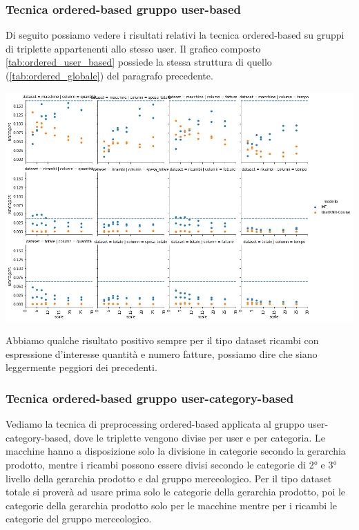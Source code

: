 \subsubsection{Tecnica ordered-based gruppo user-based}
Di seguito possiamo vedere i risultati relativi la tecnica ordered-based su gruppi di triplette appartenenti allo stesso user.
Il grafico composto \ref{tab:ordered_user_based} possiede la stessa struttura di quello (\ref{tab:ordered_globale}) del paragrafo precedente.
\begin{center}
    \includegraphics[width=16cm]{figures/risultati_ordered_singolo.png}
    \label{tab:ordered_user_based}
\end{center}
Abbiamo qualche risultato positivo sempre per il tipo dataset ricambi con espressione d'interesse quantità e numero fatture, possiamo dire che siano leggermente peggiori dei precedenti.

\subsubsection{Tecnica ordered-based gruppo user-category-based}
Vediamo la tecnica di preprocessing ordered-based applicata al gruppo user-category-based, dove le triplette vengono divise per user e per categoria.
Le macchine hanno a disposizione solo la divisione in categorie secondo la gerarchia prodotto, mentre i ricambi possono essere divisi secondo le categorie di 2° e 3° livello della gerarchia prodotto e dal gruppo merceologico. Per il tipo dataset totale si proverà ad usare prima solo le categorie della gerarchia prodotto, poi le categorie della gerarchia prodotto solo per le macchine mentre per i ricambi le categorie del gruppo merceologico.

